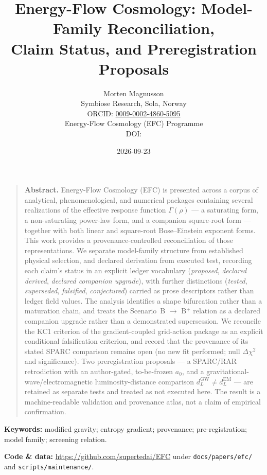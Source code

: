 \documentclass[11pt,a4paper]{article}
\title{\color{efcblue}\bfseries Energy-Flow Cosmology: Model-Family Reconciliation, \\ Claim Status, and Preregistration Proposals}
\author{Morten Magnusson \\[2pt]
        \small Symbiose Research, Sola, Norway \\
        \small ORCID: \href{https://orcid.org/0009-0002-4860-5095}{0009-0002-4860-5095} \\[2pt]
        \small Energy-Flow Cosmology (EFC) Programme \\[1pt]
        \small DOI: \paperdoi}
\date{2026-09-23}
\begin{document}
\maketitle
\thispagestyle{fancy}

\vspace{-2em}

\begin{quote}\small
\textbf{Abstract.}
Energy-Flow Cosmology (EFC) is presented across a corpus of analytical, phenomenological, and numerical packages containing several realizations of the effective response function $\Gamma(\rho)$ --- a saturating form, a non-saturating power-law form, and a companion square-root form --- together with both linear and square-root Bose--Einstein exponent forms. This work provides a provenance-controlled reconciliation of those representations. We separate model-family structure from established physical selection, and declared derivation from executed test, recording each claim's status in an explicit ledger vocabulary (\emph{proposed}, \emph{declared derived}, \emph{declared companion upgrade}), with further distinctions (\emph{tested}, \emph{superseded}, \emph{falsified}, \emph{conjectured}) carried as prose descriptors rather than ledger field values. The analysis identifies a shape bifurcation rather than a maturation chain, and treats the Scenario~B $\to$ B$^{+}$ relation as a declared companion upgrade rather than a demonstrated supersession. We reconcile the KC1 criterion of the gradient-coupled grid-action package as an explicit conditional falsification criterion, and record that the provenance of its stated SPARC comparison remains open (no new fit performed; null $\Delta\chi^{2}$ and significance). Two preregistration proposals --- a SPARC/RAR retrodiction with an author-gated, to-be-frozen $a_{0}$, and a gravitational-wave/electromagnetic luminosity-distance comparison $d_{L}^{\mathrm{GW}} \neq d_{L}^{\mathrm{EM}}$ --- are retained as separate tests and treated as not executed here. The result is a machine-readable validation and provenance atlas, not a claim of empirical confirmation.
\end{quote}

\vspace{0.5em}

\noindent\textbf{Keywords:} modified gravity; entropy gradient; provenance; pre-registration; model family; screening relation.

\vspace{0.5em}

\noindent\textbf{Code \& data:} \url{https://github.com/supertedai/EFC} under \texttt{docs/papers/efc/} and \texttt{scripts/maintenance/}.
\end{document}
